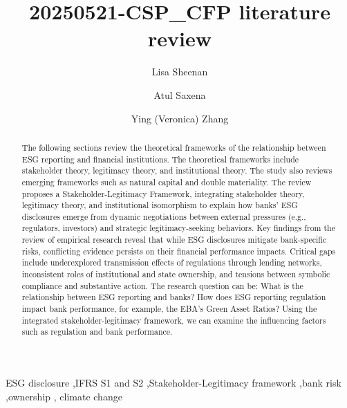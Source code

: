 \documentclass[
  authoryear]{elsarticle}
\begin{document}
\begin{frontmatter}
\title{20250521-CSP\_CFP literature review}

\author[1]{Lisa Sheenan%
%
}
\author[2]{Atul Saxena%
%
}
\author[3]{Ying (Veronica) Zhang%
%
}




        
\begin{abstract}
The following sections review the theoretical frameworks of the
relationship between ESG reporting and financial institutions. The
theoretical frameworks include stakeholder theory, legitimacy theory,
and institutional theory. The study also reviews emerging frameworks
such as natural capital and double materiality. The review proposes a
Stakeholder-Legitimacy Framework, integrating stakeholder theory,
legitimacy theory, and institutional isomorphism to explain how banks'
ESG disclosures emerge from dynamic negotiations between external
pressures (e.g., regulators, investors) and strategic legitimacy-seeking
behaviors. Key findings from the review of empirical research reveal
that while ESG disclosures mitigate bank-specific risks, conflicting
evidence persists on their financial performance impacts. Critical gaps
include underexplored transmission effects of regulations through
lending networks, inconsistent roles of institutional and state
ownership, and tensions between symbolic compliance and substantive
action. The research question can be: What is the relationship between
ESG reporting and banks? How does ESG reporting regulation impact bank
performance, for example, the EBA's Green Asset Ratios? Using the
integrated stakeholder-legitimacy framework, we can examine the
influencing factors such as regulation and bank performance.
\end{abstract}





\begin{keyword}
    ESG disclosure \sep IFRS S1 and S2 \sep Stakeholder-Legitimacy
framework \sep bank risk \sep ownership \sep 
    climate change
\end{keyword}
\end{frontmatter}
    
\end{document}
